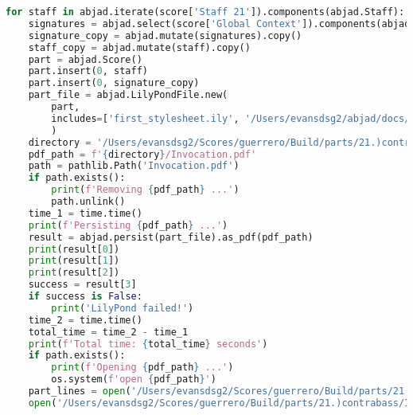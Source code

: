 \begin{lstlisting}[language=Python, caption=Invocation Source Code]
for staff in abjad.iterate(score['Staff 21']).components(abjad.Staff):
    signatures = abjad.select(score['Global Context']).components(abjad.Staff)
    signature_copy = abjad.mutate(signatures).copy()
    staff_copy = abjad.mutate(staff).copy()
    part = abjad.Score()
    part.insert(0, staff)
    part.insert(0, signature_copy)
    part_file = abjad.LilyPondFile.new(
        part,
        includes=['first_stylesheet.ily', '/Users/evansdsg2/abjad/docs/source/_stylesheets/abjad.ily'],
        )
    directory = '/Users/evansdsg2/Scores/guerrero/Build/parts/21.)contrabass'
    pdf_path = f'{directory}/Invocation.pdf'
    path = pathlib.Path('Invocation.pdf')
    if path.exists():
        print(f'Removing {pdf_path} ...')
        path.unlink()
    time_1 = time.time()
    print(f'Persisting {pdf_path} ...')
    result = abjad.persist(part_file).as_pdf(pdf_path)
    print(result[0])
    print(result[1])
    print(result[2])
    success = result[3]
    if success is False:
        print('LilyPond failed!')
    time_2 = time.time()
    total_time = time_2 - time_1
    print(f'Total time: {total_time} seconds')
    if path.exists():
        print(f'Opening {pdf_path} ...')
        os.system(f'open {pdf_path}')
    part_lines = open('/Users/evansdsg2/Scores/guerrero/Build/parts/21.)contrabass/Invocation.ly').readlines()
    open('/Users/evansdsg2/Scores/guerrero/Build/parts/21.)contrabass/Invocation.ly', 'w').writelines(part_lines[15:-1])
\end{lstlisting}
